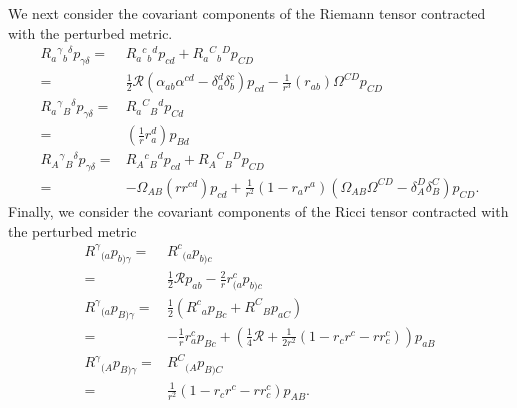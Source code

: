 \documentclass[12pt]{report}
\begin{document}
We next consider the covariant components of the Riemann tensor contracted
with the perturbed metric.
\begin{subequations}
\begin{align}
    R_{a}{}^{\gamma}{}_b{}^{\delta}p_{\gamma\delta}
    =&
    R_{a}{}^{c}{}_b{}^{d}p_{cd}
    +
    R_{a}{}^{C}{}_b{}^{D}p_{CD}
    \nonumber\\
    =&
    \frac{1}{2}\mathcal{R}
    \left(\alpha_{ab}\alpha^{cd} - \delta^d_a\delta^c_b\right)
    p_{cd}
    -
    \frac{1}{r^3}\left(r_{ab}\right)\Omega^{CD}p_{CD}
    \\
    R_a{}^{\gamma}{}_B{}^{\delta}p_{\gamma\delta}
    =&
    R_a{}^C{}_B{}^dp_{Cd}
    \nonumber\\
    =&
    \left(\frac{1}{r}r_a^d\right)p_{Bd}
    \\
    R_A{}^{\gamma}{}_B{}^{\delta}p_{\gamma\delta}
    =&
    R_A{}^{c}{}_B{}^{d}p_{cd}
    +
    R_A{}^{C}{}_B{}^{D}p_{CD}
    \nonumber\\
    =&
    -
    \Omega_{AB}\left(r r^{cd}\right)p_{cd}
    +
    \frac{1}{r^2}\left(
        1
        -
        r_ar^a
    \right)
    \left(\Omega_{AB}\Omega^{CD} - \delta^D_A\delta^C_B\right)
    p_{CD}
    .
\end{align}
\end{subequations}
Finally, we consider the covariant components of the Ricci tensor
contracted with the perturbed metric
\begin{subequations}
\begin{align}
    R^{\gamma}{}_{(a}p_{b)\gamma}
    =&
    R^c{}_{(a}p_{b)c}
    \nonumber\\
    =&
    \frac{1}{2}\mathcal{R} p_{ab}
    -
    \frac{2}{r}r^c_{(a}p_{b)c}
    \\
    R^{\gamma}{}_{(a}p_{B)\gamma}
    =&
    \frac{1}{2}\left(
        R^c{}_{a}p_{Bc}
        +
        R^C{}_{B}p_{aC}
    \right)
    \nonumber\\
    =&
    -
    \frac{1}{r}r_a^cp_{Bc}
    +
    \left(
        \frac{1}{4}\mathcal{R}
        +
        \frac{1}{2r^2}
        \left(
            1
            -
            r_cr^c
            -
            rr_c^c
        \right)
    \right)
    p_{aB}
    \\
    R^{\gamma}{}_{(A}p_{B)\gamma}
    =&
    R^{C}{}_{(A}p_{B)C}
    \nonumber\\
    =&
    \frac{1}{r^2}
    \left(
        1
        -
        r_cr^c
        -
        rr_c^c
    \right)
    p_{AB}
    .
\end{align}
\end{subequations}
\end{document}
